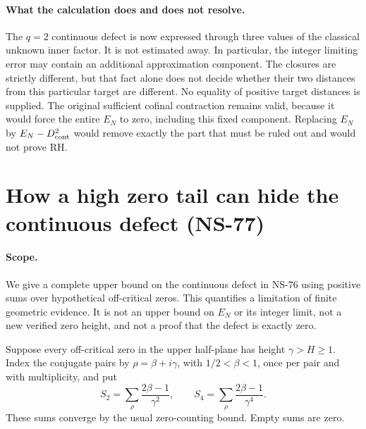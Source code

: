 \paragraph{What the calculation does and does not resolve.}
The $q=2$ continuous defect is now expressed through three values of the
classical unknown inner factor. It is not estimated away. In particular,
the integer limiting error may contain an additional approximation
component. The closures are strictly different, but that fact alone
does not decide whether their two distances from this particular target
are different. No equality of positive target distances is supplied.
The original sufficient cofinal contraction remains valid, because it
would force the entire $E_N$ to zero, including this fixed component.
Replacing $E_N$ by $E_N-D_{\rm cont}^2$ would remove exactly the part
that must be ruled out and would not prove RH.

\section{How a high zero tail can hide the continuous defect (NS-77)}
\label{sec:ns77-continuous-tail}

\paragraph{Scope.}
We give a complete upper bound on the continuous defect in NS-76 using
positive sums over hypothetical off-critical zeros. This quantifies a
limitation of finite geometric evidence. It is not an upper bound on
$E_N$ or its integer limit, not a new verified zero height, and not a
proof that the defect is exactly zero.

Suppose every off-critical zero in the upper half-plane has height
$\gamma>H\geq1$. Index the conjugate pairs by $\rho=\beta+i\gamma$,
with $1/2<\beta<1$, once per pair and with multiplicity, and put
\[
 S_2=\sum_\rho\frac{2\beta-1}{\gamma^2},\qquad
 S_4=\sum_\rho\frac{2\beta-1}{\gamma^4}.
\]
These sums converge by the usual zero-counting bound. Empty sums are zero.


